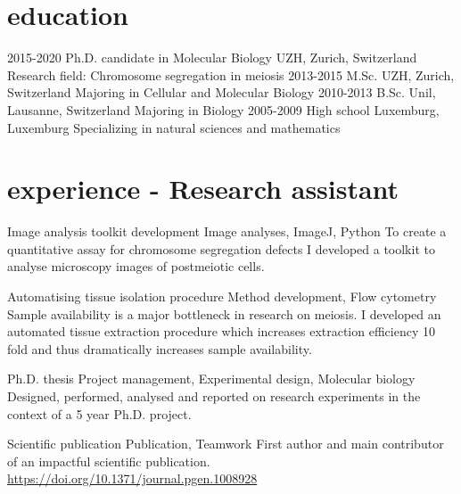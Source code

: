 \documentclass[]{Joes_20s_cv_class}
\begin{document}
\section{education}

\begin{date_3text}
  \event
    {2015-2020}
    {Ph.D. {\normalfont candidate in Molecular Biology}}
    {UZH, Zurich, Switzerland}
    {Research field: Chromosome segregation in meiosis}
  \event
    {2013-2015}
    {M.Sc.}
    {UZH, Zurich, Switzerland}
    {Majoring in Cellular and Molecular Biology}
  \event
    {2010-2013}
    {B.Sc.}
    {Unil, Lausanne, Switzerland}
    {Majoring in Biology}
  \event
    {2005-2009}
    {High school}
    {Luxemburg, Luxemburg}
    {Specializing in natural sciences and mathematics}
\end{date_3text}




\section{experience - Research assistant}

\task
    {Image analysis toolkit development}
    {Image analyses, ImageJ, Python}
    {To create a quantitative assay for chromosome segregation defects I developed a toolkit to analyse microscopy images of postmeiotic cells.}

\task
    {Automatising tissue isolation procedure}
    {Method development, Flow cytometry}
    {Sample availability is a major bottleneck in research on meiosis. I developed an automated tissue extraction procedure which increases extraction efficiency 10 fold and thus dramatically increases sample availability.}

\task
    {Ph.D. thesis}
    {Project management, Experimental design, Molecular biology}
    {Designed, performed, analysed and reported on research experiments in the context of a 5 year Ph.D. project.}

\task
    {Scientific publication}
    {Publication, Teamwork}
    {First author and main contributor of an impactful scientific publication. \href{https://doi.org/10.1371/journal.pgen.1008928}{https://doi.org/10.1371/journal.pgen.1008928}}
\end{document}
